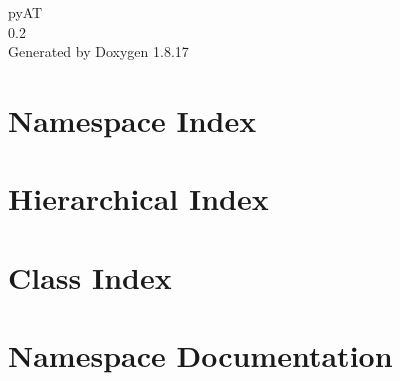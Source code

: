 \let\mypdfximage\pdfximage\def\pdfximage{\immediate\mypdfximage}\documentclass[twoside]{book}
\newcommand{\+}{\discretionary{\mbox{\scriptsize$\hookleftarrow$}}{}{}}
\newcommand{\clearemptydoublepage}{%
  \newpage{\pagestyle{empty}\cleardoublepage}%
}
\begin{document}
\hypersetup{pageanchor=false,
             bookmarksnumbered=true,
             pdfencoding=unicode
            }
\begin{titlepage}
\vspace*{7cm}
\begin{center}%
{\Large py\+AT \\[1ex]\large 0.\+2 }\\
\vspace*{1cm}
{\large Generated by Doxygen 1.8.17}\\
\end{center}
\end{titlepage}
\clearemptydoublepage
{}
\tableofcontents
\clearemptydoublepage
{}
\hypersetup{pageanchor=true}

\chapter{Namespace Index}

\chapter{Hierarchical Index}

\chapter{Class Index}

\chapter{Namespace Documentation}




































\end{document}
